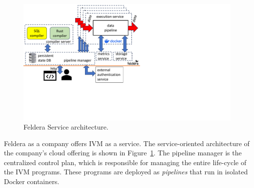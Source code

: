 \begin{figure}[h]
  \begin{center}
  \includegraphics[trim={0 2.4in 4.3in 0},clip,scale=.44]{services.pdf}
  \caption{\label{fig:service}Feldera Service architecture.}
  \end{center}
\end{figure}

Feldera as a company offers IVM as a service.  The service-oriented
architecture of the company's cloud offering is shown in
Figure~\ref{fig:service}.  The pipeline manager is the centralized
control plan, which is responsible for managing the entire life-cycle
of the IVM programs.  These programs are deployed as \emph{pipelines}
that run in isolated Docker containers.

